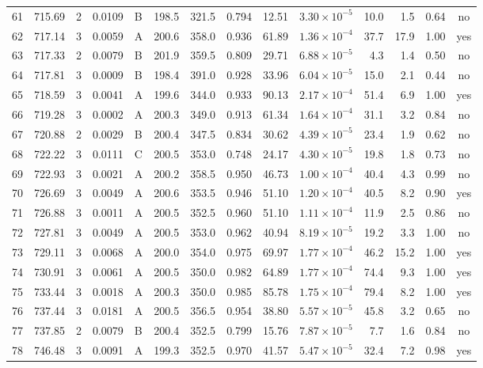 \begin{landscape}
\begin{longtable}{rrrrlrrrrrrrrc}
61 & 715.69 & 2 & 0.0109 & B & 198.5 & 321.5 & 0.794 & 12.51 & $3.30\times10^{-5}$ & 10.0 & 1.5 & 0.64 & no \\
62 & 717.14 & 3 & 0.0059 & A & 200.6 & 358.0 & 0.936 & 61.89 & $1.36\times10^{-4}$ & 37.7 & 17.9 & 1.00 & yes \\
63 & 717.33 & 2 & 0.0079 & B & 201.9 & 359.5 & 0.809 & 29.71 & $6.88\times10^{-5}$ & 4.3 & 1.4 & 0.50 & no \\
64 & 717.81 & 3 & 0.0009 & B & 198.4 & 391.0 & 0.928 & 33.96 & $6.04\times10^{-5}$ & 15.0 & 2.1 & 0.44 & no \\
65 & 718.59 & 3 & 0.0041 & A & 199.6 & 344.0 & 0.933 & 90.13 & $2.17\times10^{-4}$ & 51.4 & 6.9 & 1.00 & yes \\
66 & 719.28 & 3 & 0.0002 & A & 200.3 & 349.0 & 0.913 & 61.34 & $1.64\times10^{-4}$ & 31.1 & 3.2 & 0.84 & no \\
67 & 720.88 & 2 & 0.0029 & B & 200.4 & 347.5 & 0.834 & 30.62 & $4.39\times10^{-5}$ & 23.4 & 1.9 & 0.62 & no \\
68 & 722.22 & 3 & 0.0111 & C & 200.5 & 353.0 & 0.748 & 24.17 & $4.30\times10^{-5}$ & 19.8 & 1.8 & 0.73 & no \\
69 & 722.93 & 3 & 0.0021 & A & 200.2 & 358.5 & 0.950 & 46.73 & $1.00\times10^{-4}$ & 40.4 & 4.3 & 0.99 & no \\
70 & 726.69 & 3 & 0.0049 & A & 200.6 & 353.5 & 0.946 & 51.10 & $1.20\times10^{-4}$ & 40.5 & 8.2 & 0.90 & yes \\
71 & 726.88 & 3 & 0.0011 & A & 200.5 & 352.5 & 0.960 & 51.10 & $1.11\times10^{-4}$ & 11.9 & 2.5 & 0.86 & no \\
72 & 727.81 & 3 & 0.0049 & A & 200.5 & 353.0 & 0.962 & 40.94 & $8.19\times10^{-5}$ & 19.2 & 3.3 & 1.00 & no \\
73 & 729.11 & 3 & 0.0068 & A & 200.0 & 354.0 & 0.975 & 69.97 & $1.77\times10^{-4}$ & 46.2 & 15.2 & 1.00 & yes \\
74 & 730.91 & 3 & 0.0061 & A & 200.5 & 350.0 & 0.982 & 64.89 & $1.77\times10^{-4}$ & 74.4 & 9.3 & 1.00 & yes \\
75 & 733.44 & 3 & 0.0018 & A & 200.3 & 350.0 & 0.985 & 85.78 & $1.75\times10^{-4}$ & 79.4 & 8.2 & 1.00 & yes \\
76 & 737.44 & 3 & 0.0181 & A & 200.5 & 356.5 & 0.954 & 38.80 & $5.57\times10^{-5}$ & 45.8 & 3.2 & 0.65 & no \\
77 & 737.85 & 2 & 0.0079 & B & 200.4 & 352.5 & 0.799 & 15.76 & $7.87\times10^{-5}$ & 7.7 & 1.6 & 0.84 & no \\
78 & 746.48 & 3 & 0.0091 & A & 199.3 & 352.5 & 0.970 & 41.57 & $5.47\times10^{-5}$ & 32.4 & 7.2 & 0.98 & yes \\

\end{longtable}
\end{landscape}
